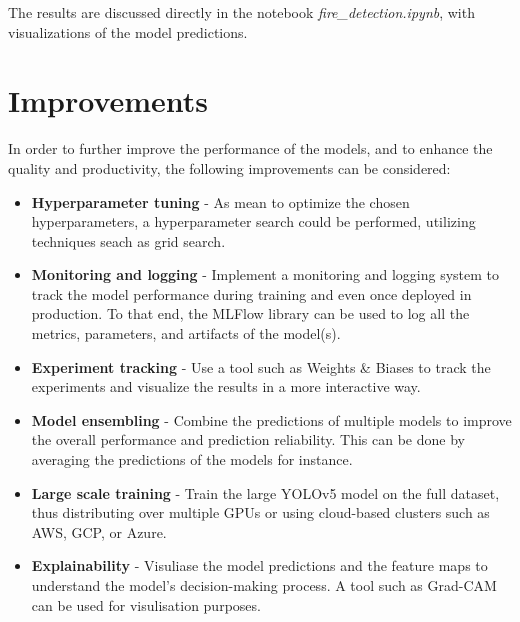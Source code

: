\documentclass{article}
\begin{document}
The results are discussed directly in the notebook \textit{fire\_detection.ipynb}, with visualizations of the model predictions.

\newpage

\section{Improvements}

In order to further improve the performance of the models, and to enhance the quality and productivity, the following improvements can be considered:

\begin{itemize}
    \item \textbf{Hyperparameter tuning} - As mean to optimize the chosen hyperparameters, a hyperparameter search could be performed, utilizing techniques seach as grid search.
    \item \textbf{Monitoring and logging} - Implement a monitoring and logging system to track the model performance during training and even once deployed in production. To that end, the MLFlow library can be used to log all the metrics, parameters, and artifacts of the model(s).
    \item \textbf{Experiment tracking} - Use a tool such as Weights \& Biases to track the experiments and visualize the results in a more interactive way.
    \item \textbf{Model ensembling} - Combine the predictions of multiple models to improve the overall performance and prediction reliability. This can be done by averaging the predictions of the models for instance.
    \item \textbf{Large scale training} - Train the large YOLOv5 model on the full dataset, thus distributing over multiple GPUs or using cloud-based clusters such as AWS, GCP, or Azure.
    \item \textbf{Explainability} - Visuliase the model predictions and the feature maps to understand the model's decision-making process. A tool such as Grad-CAM can be used for visulisation purposes.
\end{itemize}
\end{document}
